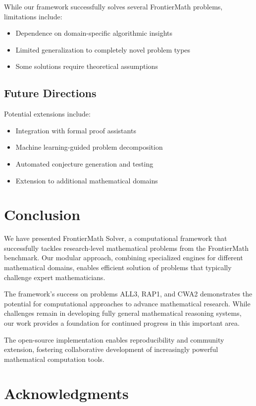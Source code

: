 \documentclass[11pt]{article}
\begin{document}
While our framework successfully solves several FrontierMath problems, limitations include:

\begin{itemize}
\item Dependence on domain-specific algorithmic insights
\item Limited generalization to completely novel problem types
\item Some solutions require theoretical assumptions
\end{itemize}

\subsection{Future Directions}

Potential extensions include:

\begin{itemize}
\item Integration with formal proof assistants
\item Machine learning-guided problem decomposition
\item Automated conjecture generation and testing
\item Extension to additional mathematical domains
\end{itemize}

\section{Conclusion}

We have presented FrontierMath Solver, a computational framework that successfully tackles research-level mathematical problems from the FrontierMath benchmark. Our modular approach, combining specialized engines for different mathematical domains, enables efficient solution of problems that typically challenge expert mathematicians.

The framework's success on problems ALL3, RAP1, and CWA2 demonstrates the potential for computational approaches to advance mathematical research. While challenges remain in developing fully general mathematical reasoning systems, our work provides a foundation for continued progress in this important area.

The open-source implementation enables reproducibility and community extension, fostering collaborative development of increasingly powerful mathematical computation tools.

\section{Acknowledgments}
\end{document}
